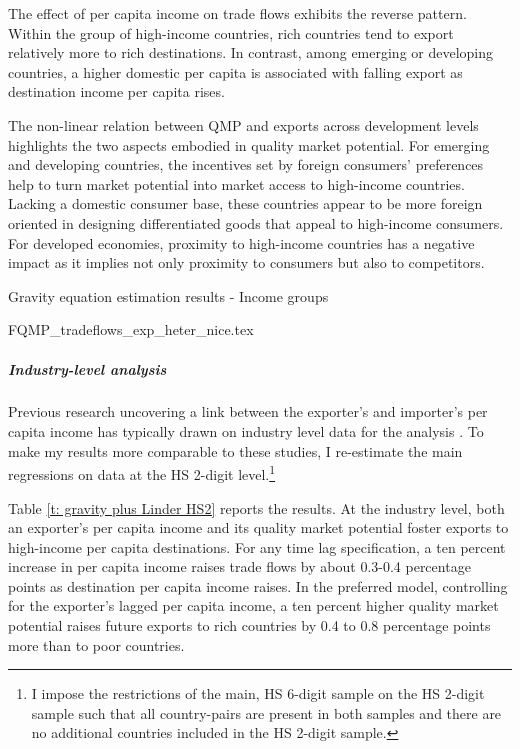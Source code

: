 \documentclass[12pt,a4paper,oneside,times]{article}   	%
\newcommand{\tablespath}{{"C:/Users/dhill/Dropbox/Dissertation"}}
\begin{document}
The effect of per capita income on trade flows exhibits the reverse pattern. Within the group of high-income countries, rich  countries tend to export relatively more to rich  destinations. In contrast, among emerging or developing countries, a higher domestic per capita is associated with falling export as destination income per capita rises.

The non-linear relation between QMP and exports across development levels highlights the two aspects embodied in quality market potential. For emerging and developing countries, the incentives set by foreign consumers' preferences help to turn market potential into market access to high-income countries. Lacking a domestic consumer base, these countries appear to be more foreign oriented in designing differentiated goods that appeal to high-income consumers. For developed economies, proximity to high-income countries has a negative impact as it implies not only proximity to consumers but also to competitors.

\begin{table}[htbp]\centering
\caption{Gravity equation estimation results - Income groups \label{t: gravity heter}}
{FQMP_tradeflows_exp_heter_nice.tex}
\end{table}

\subparagraph{Industry-level analysis}

Previous research uncovering a link between the exporter's and importer's per capita income has typically drawn on industry level data for the analysis \citep{Hallak2006,Fieler2011,Caron2014,Fajgelbaum2016}. To make my results more comparable to these studies, I re-estimate the main regressions on data at the HS 2-digit level.\footnote{I impose the restrictions of the main, HS 6-digit sample on the HS 2-digit sample such that  all country-pairs are present in both samples and there are no additional countries included in the HS 2-digit sample.} 

Table \ref{t: gravity plus Linder HS2} reports the results. At the industry level, both an exporter's per capita income and its quality market potential foster exports to high-income per capita destinations. For any time lag specification, a ten percent increase in per capita income raises trade flows by about 0.3-0.4 percentage points as destination per capita income raises. In the preferred model, controlling for the exporter's lagged per capita income, a ten percent higher quality market potential raises future exports to rich countries by 0.4 to 0.8 percentage points more than to poor countries.
\end{document}
